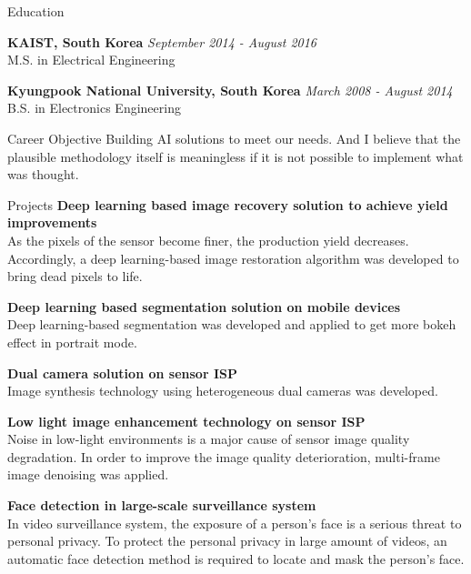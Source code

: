 \documentclass{resume}
\begin{document}
\begin{rSection}{Education}

{\bf KAIST, South Korea} \hfill {\em September 2014 - August 2016} 
\\ M.S. in Electrical Engineering\hfill

{\bf Kyungpook National University, South Korea} \hfill {\em March 2008 - August 2014} 
\\ B.S. in Electronics Engineering\hfill 

\end{rSection}

\begin{rSection}{Career Objective}
 Building AI solutions to meet our needs.
 And I believe that the plausible methodology itself is meaningless if it is not possible to implement what was thought.
\end{rSection}

\begin{rSection}{Projects}
{\bf Deep learning based image recovery solution to achieve yield improvements}
\\ As the pixels of the sensor become finer, the production yield decreases. Accordingly, a deep learning-based image restoration algorithm was developed to bring dead pixels to life.

{\bf Deep learning based segmentation solution on mobile devices}
\\ Deep learning-based segmentation was developed and applied to get more bokeh effect in portrait mode.

{\bf Dual camera solution on sensor ISP}
\\ Image synthesis technology using heterogeneous dual cameras was developed.

{\bf Low light image enhancement technology on sensor ISP}
\\ Noise in low-light environments is a major cause of sensor image quality degradation. In order to improve the image quality deterioration, multi-frame image denoising was applied.

{\bf Face detection in large-scale surveillance system }
\\ In video surveillance system, the exposure of a person’s face is a serious threat to personal privacy.
To protect the personal privacy in large amount of videos, an automatic face detection method is required to locate and mask the person’s face.

\end{rSection}
\end{document}
